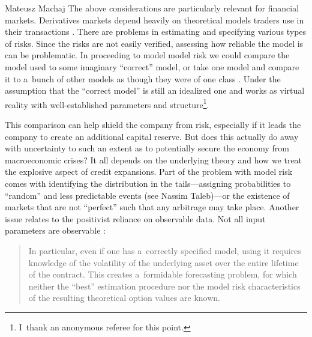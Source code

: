 \begin{artengenv}{Mateusz Machaj}
The above considerations are particularly relevant for financial markets. Derivatives markets depend heavily on theoretical models traders use in their transactions 
\parencite[][p.1466]{green_market_1999}. %
 There are problems in estimating and specifying various types of risks. Since the risks are not easily verified, assessing how reliable the model is can be problematic. In proceeding to model model risk we could compare the model used to some imaginary ``correct'' model, or take one model and compare it to a~bunch of other models as though they were of one class 
\parencite[][p.268]{kerkhof_model_2010}. %
 Under the assumption that the ``correct model'' is still an idealized one and works as virtual reality with well-established parameters and structure\footnote{I~thank an anonymous referee for this point.}.



This comparison can help shield the company from risk, especially if it leads the company to create an additional capital reserve. But does this actually do away with uncertainty to such an extent as to potentially secure the economy from macroeconomic crises? It all depends on the underlying theory and how we treat the explosive aspect of credit expansions. Part of the problem with model risk comes with identifying the distribution in the tails---assigning probabilities to ``random'' and less predictable events (see Nassim Taleb)---or the existence of markets that are not ``perfect'' such that any arbitrage may take place. Another issue relates to the positivist reliance on observable data. Not all input parameters are observable 
\parencite[][p.1467]{green_market_1999}:%
\begin{quote}
In particular, even if one has a~correctly specified model, using it requires knowledge of the volatility of the underlying asset over the entire lifetime of the contract. This creates a~formidable forecasting problem, for which neither the ``best'' estimation procedure nor the model risk characteristics of the resulting theoretical option values are known.
\end{quote}




\end{artengenv}
